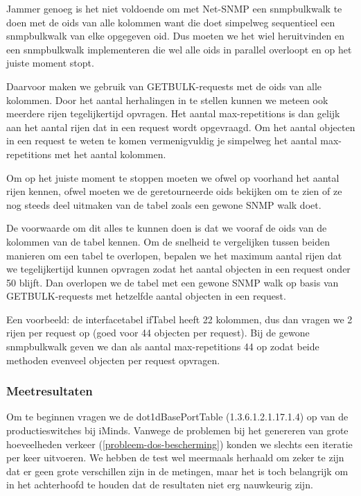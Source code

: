 Jammer genoeg is het niet voldoende om met Net-SNMP een snmpbulkwalk te doen met de \glspl{oid} van alle kolommen want
die doet simpelweg sequentieel een snmpbulkwalk van elke opgegeven \gls{oid}.
Dus moeten we het wiel heruitvinden en een snmpbulkwalk implementeren die wel alle \glspl{oid} in parallel overloopt en op het juiste moment stopt.

Daarvoor maken we gebruik van GETBULK-requests met de \glspl{oid} van alle kolommen.
Door het aantal herhalingen in te stellen kunnen we meteen ook meerdere rijen tegelijkertijd opvragen.
Het aantal max-repetitions is dan gelijk aan het aantal rijen dat in een request wordt opgevraagd.
Om het aantal objecten in een request te weten te komen vermenigvuldig je simpelweg het aantal max-repetitions met het aantal kolommen.

Om op het juiste moment te stoppen moeten we ofwel op voorhand het aantal rijen kennen, ofwel moeten we de geretourneerde \glspl{oid}
bekijken om te zien of ze nog steeds deel uitmaken van de tabel zoals een gewone SNMP walk doet.

De voorwaarde om dit alles te kunnen doen is dat we vooraf de \glspl{oid} van de kolommen van de tabel kennen.
Om de snelheid te vergelijken tussen beiden manieren om een tabel te overlopen,
bepalen we het maximum aantal rijen dat we tegelijkertijd kunnen opvragen zodat het aantal objecten in een request onder 50 blijft.
Dan overlopen we de tabel met een gewone SNMP walk op basis van GETBULK-requests met hetzelfde aantal objecten in een request.

Een voorbeeld: de interfacetabel ifTabel heeft 22 kolommen, dus dan vragen we 2 rijen per request op (goed voor 44 objecten per request).
Bij de gewone snmpbulkwalk geven we dan als aantal max-repetitions 44 op zodat beide methoden evenveel objecten per request opvragen.

\subsubsection{Meetresultaten}

Om te beginnen vragen we de dot1dBasePortTable (1.3.6.1.2.1.17.1.4) op van de productieswitches bij iMinds.
Vanwege de problemen bij het genereren van grote hoeveelheden verkeer (\cref{probleem-dos-bescherming}) konden we slechts een iteratie per keer uitvoeren.
We hebben de test wel meermaals herhaald om zeker te zijn dat er geen grote verschillen zijn in de metingen,
maar het is toch belangrijk om in het achterhoofd te houden dat de resultaten niet erg nauwkeurig zijn.

